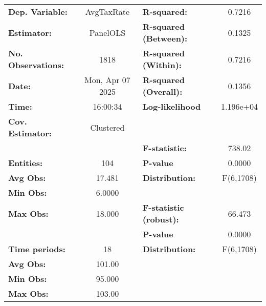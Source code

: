 \begin{center}
\begin{tabular}{lclc}
\toprule
\textbf{Dep. Variable:}              &     AvgTaxRate     & \textbf{  R-squared:         }   &      0.7216      \\
\textbf{Estimator:}                  &      PanelOLS      & \textbf{  R-squared (Between):}  &      0.1325      \\
\textbf{No. Observations:}           &        1818        & \textbf{  R-squared (Within):}   &      0.7216      \\
\textbf{Date:}                       &  Mon, Apr 07 2025  & \textbf{  R-squared (Overall):}  &      0.1356      \\
\textbf{Time:}                       &      16:00:34      & \textbf{  Log-likelihood     }   &    1.196e+04     \\
\textbf{Cov. Estimator:}             &     Clustered      & \textbf{                     }   &                  \\
\textbf{}                            &                    & \textbf{  F-statistic:       }   &      738.02      \\
\textbf{Entities:}                   &        104         & \textbf{  P-value            }   &      0.0000      \\
\textbf{Avg Obs:}                    &       17.481       & \textbf{  Distribution:      }   &    F(6,1708)     \\
\textbf{Min Obs:}                    &       6.0000       & \textbf{                     }   &                  \\
\textbf{Max Obs:}                    &       18.000       & \textbf{  F-statistic (robust):} &      66.473      \\
\textbf{}                            &                    & \textbf{  P-value            }   &      0.0000      \\
\textbf{Time periods:}               &         18         & \textbf{  Distribution:      }   &    F(6,1708)     \\
\textbf{Avg Obs:}                    &       101.00       & \textbf{                     }   &                  \\
\textbf{Min Obs:}                    &       95.000       & \textbf{                     }   &                  \\
\textbf{Max Obs:}                    &       103.00       & \textbf{                     }   &                  \\

\end{tabular}
\end{center}
